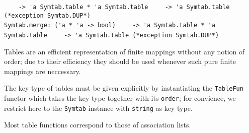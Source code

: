 \begin{isabellebody}
\begin{isamarkuptext}
\begin{mldecls}
\verb|    -> 'a Symtab.table * 'a Symtab.table|\isasep\isanewline%
\verb|    -> 'a Symtab.table (*exception Symtab.DUP*)| \\
  \verb|Symtab.merge: ('a * 'a -> bool)|\isasep\isanewline%
\verb|    -> 'a Symtab.table * 'a Symtab.table|\isasep\isanewline%
\verb|    -> 'a Symtab.table (*exception Symtab.DUP*)|
  \end{mldecls}%
\end{isamarkuptext}%
\isamarkuptrue%
%
\begin{isamarkuptext}%
Tables are an efficient representation of finite mappings without
  any notion of order;  due to their efficiency they should be used
  whenever such pure finite mappings are neccessary.

  The key type of tables must be given explicitly by instantiating
  the \verb|TableFun| functor which takes the key type
  together with its \verb|order|; for convience, we restrict
  here to the \verb|Symtab| instance with \verb|string|
  as key type.

  Most table functions correspond to those of association lists.%
\end{isamarkuptext}%
\isamarkuptrue%
%
\isadelimtheory
%
\endisadelimtheory
%
\isatagtheory
{}\isamarkupfalse%
%
\endisatagtheory
{\isafoldtheory}%
%
\isadelimtheory
%
\endisadelimtheory
\isanewline
\end{isabellebody}%
